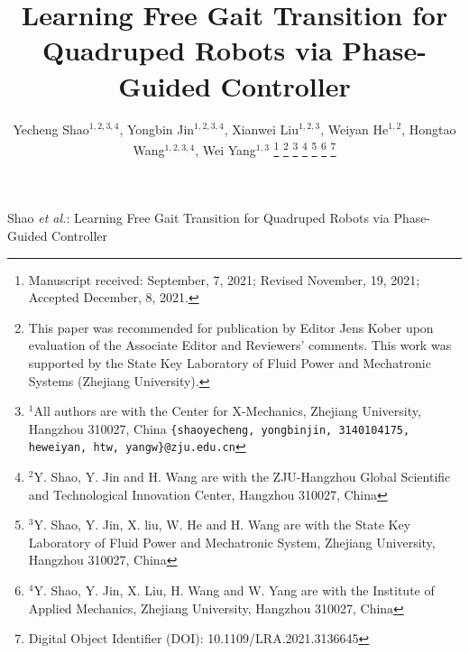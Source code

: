 \documentclass[letterpaper, 10 pt, journal, twoside]{IEEEtran} %
\begin{document}
\title{Learning Free Gait Transition for Quadruped Robots via Phase-Guided Controller}

\author{Yecheng Shao$^{1,2,3,4}$, Yongbin Jin$^{1,2,3,4}$, Xianwei Liu$^{1,2,3}$, Weiyan He$^{1,2}$, Hongtao Wang$^{1,2,3,4}$, Wei Yang$^{1,3}$%
\thanks{Manuscript received: September, 7, 2021; Revised November, 19, 2021; Accepted December, 8, 2021.}%
\thanks{This paper was recommended for publication by Editor Jens Kober upon evaluation of the Associate Editor and Reviewers' comments. 
	This work was supported by the State Key Laboratory of Fluid Power and Mechatronic Systems (Zhejiang University).}%
\thanks{$^{1}$All authors are with the Center for X-Mechanics, Zhejiang University, Hangzhou 310027, China
		{\tt\small \{shaoyecheng, yongbinjin, 3140104175, heweiyan, htw, yangw\}@zju.edu.cn}}%
\thanks{$^{2}$Y. Shao, Y. Jin and H. Wang are with the ZJU-Hangzhou Global Scientific and Technological Innovation Center, Hangzhou 310027, China}%
\thanks{$^{3}$Y. Shao, Y. Jin, X. liu, W. He and H. Wang are with the State Key Laboratory of Fluid Power and Mechatronic System, Zhejiang University, Hangzhou 310027, China}%
\thanks{$^{4}$Y. Shao, Y. Jin, X. Liu, H. Wang and W. Yang are with the Institute of Applied Mechanics, Zhejiang University, Hangzhou 310027, China}%
\thanks{Digital Object Identifier (DOI): 10.1109/LRA.2021.3136645}
}

{Shao \MakeLowercase{\textit{et al.}}: Learning Free Gait Transition for Quadruped Robots via Phase-Guided Controller} 

\maketitle
\thispagestyle{fancy}
\fancyhf{}
\renewcommand{\headrulewidth}{0pt}
\end{document}
